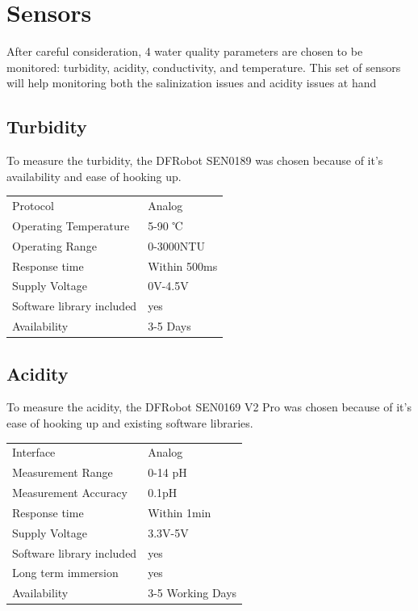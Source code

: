 \newpage
\section{Sensors}
After careful consideration, 4 water quality parameters are chosen to be monitored: turbidity, acidity, conductivity, and temperature. This set of sensors will help monitoring both the salinization issues and acidity issues at hand

\subsection{Turbidity}
To measure the turbidity, the DFRobot SEN0189 \cite{SEN0189} was chosen because of it's availability and ease of hooking up.
\begin{table}[h!]
	\centering
	\quad
	\begin{tabular}{| l | l |}
    \hline
    Protocol & Analog\\
    Operating Temperature & 5-90 ℃ \\
    Operating Range &  0-3000NTU\\
    Response time & Within 500ms \\
    Supply Voltage & 0V-4.5V \\
    Software library included & yes \\
    Availability & 3-5 Days \\
    \hline
	\end{tabular}
\end{table}

\subsection{Acidity}
To measure the acidity, the DFRobot SEN0169 V2 Pro \cite{SEN0169V2} was chosen because of it's ease of hooking up and existing software libraries.
\begin{table}[h!]
	\centering
	\quad
	\begin{tabular}{| l | l |}
    \hline
    Interface & Analog \\
    Measurement Range & 0-14 pH \\
    Measurement Accuracy &  0.1pH \\
    Response time & Within 1min \\
    Supply Voltage & 3.3V-5V \\
    Software library included & yes \\
    Long term immersion & yes \\
    Availability & 3-5 Working Days \\
    \hline
	\end{tabular}
\end{table}

